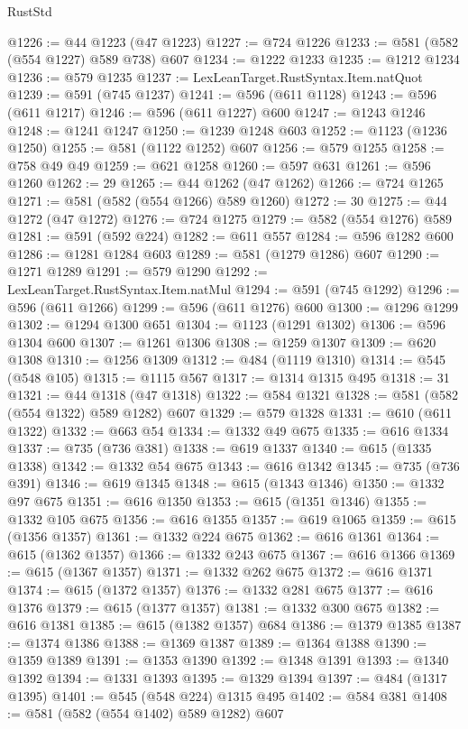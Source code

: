 \begin{lexlean}{RustStd}
\begin{coremodule}
@1226 := @44 @1223 (@47 @1223)
@1227 := @724 @1226
@1233 := @581 (@582 (@554 @1227) @589 @738) @607
@1234 := @1222 @1233
@1235 := @1212 @1234
@1236 := @579 @1235
@1237 := LexLeanTarget.RustSyntax.Item.natQuot
@1239 := @591 (@745 @1237)
@1241 := @596 (@611 @1128)
@1243 := @596 (@611 @1217)
@1246 := @596 (@611 @1227) @600
@1247 := @1243 @1246
@1248 := @1241 @1247
@1250 := @1239 @1248 @603
@1252 := @1123 (@1236 @1250)
@1255 := @581 (@1122 @1252) @607
@1256 := @579 @1255
@1258 := @758 @49 @49
@1259 := @621 @1258
@1260 := @597 @631
@1261 := @596 @1260
@1262 := 29
@1265 := @44 @1262 (@47 @1262)
@1266 := @724 @1265
@1271 := @581 (@582 (@554 @1266) @589 @1260)
@1272 := 30
@1275 := @44 @1272 (@47 @1272)
@1276 := @724 @1275
@1279 := @582 (@554 @1276) @589
@1281 := @591 (@592 @224)
@1282 := @611 @557
@1284 := @596 @1282 @600
@1286 := @1281 @1284 @603
@1289 := @581 (@1279 @1286) @607
@1290 := @1271 @1289
@1291 := @579 @1290
@1292 := LexLeanTarget.RustSyntax.Item.natMul
@1294 := @591 (@745 @1292)
@1296 := @596 (@611 @1266)
@1299 := @596 (@611 @1276) @600
@1300 := @1296 @1299
@1302 := @1294 @1300 @651
@1304 := @1123 (@1291 @1302)
@1306 := @596 @1304 @600
@1307 := @1261 @1306
@1308 := @1259 @1307
@1309 := @620 @1308
@1310 := @1256 @1309
@1312 := @484 (@1119 @1310)
@1314 := @545 (@548 @105)
@1315 := @1115 @567
@1317 := @1314 @1315 @495
@1318 := 31
@1321 := @44 @1318 (@47 @1318)
@1322 := @584 @1321
@1328 := @581 (@582 (@554 @1322) @589 @1282) @607
@1329 := @579 @1328
@1331 := @610 (@611 @1322)
@1332 := @663 @54
@1334 := @1332 @49 @675
@1335 := @616 @1334
@1337 := @735 (@736 @381)
@1338 := @619 @1337
@1340 := @615 (@1335 @1338)
@1342 := @1332 @54 @675
@1343 := @616 @1342
@1345 := @735 (@736 @391)
@1346 := @619 @1345
@1348 := @615 (@1343 @1346)
@1350 := @1332 @97 @675
@1351 := @616 @1350
@1353 := @615 (@1351 @1346)
@1355 := @1332 @105 @675
@1356 := @616 @1355
@1357 := @619 @1065
@1359 := @615 (@1356 @1357)
@1361 := @1332 @224 @675
@1362 := @616 @1361
@1364 := @615 (@1362 @1357)
@1366 := @1332 @243 @675
@1367 := @616 @1366
@1369 := @615 (@1367 @1357)
@1371 := @1332 @262 @675
@1372 := @616 @1371
@1374 := @615 (@1372 @1357)
@1376 := @1332 @281 @675
@1377 := @616 @1376
@1379 := @615 (@1377 @1357)
@1381 := @1332 @300 @675
@1382 := @616 @1381
@1385 := @615 (@1382 @1357) @684
@1386 := @1379 @1385
@1387 := @1374 @1386
@1388 := @1369 @1387
@1389 := @1364 @1388
@1390 := @1359 @1389
@1391 := @1353 @1390
@1392 := @1348 @1391
@1393 := @1340 @1392
@1394 := @1331 @1393
@1395 := @1329 @1394
@1397 := @484 (@1317 @1395)
@1401 := @545 (@548 @224) @1315 @495
@1402 := @584 @381
@1408 := @581 (@582 (@554 @1402) @589 @1282) @607

\end{coremodule}
\end{lexlean}
